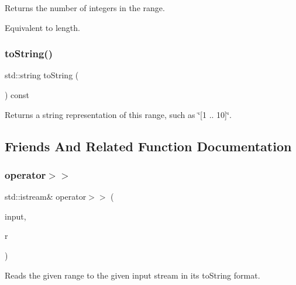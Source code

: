 Returns the number of integers in the range. 

Equivalent to length. \mbox{\label{classIntRange_a1fe5121d6528fdea3f243321b3fa3a49}} 
\subsubsection{\texorpdfstring{to\+String()}{toString()}}
{\footnotesize\ttfamily std\+::string to\+String (\begin{DoxyParamCaption}{ }\end{DoxyParamCaption}) const}



Returns a string representation of this range, such as \char`\"{}\mbox{[}1 .. 10\mbox{]}\char`\"{}. 



\subsection{Friends And Related Function Documentation}
\mbox{\label{classIntRange_a4b452901f18832cc506afd0f320e5934}} 
\subsubsection{\texorpdfstring{operator$>$$>$}{operator>>}}
{\footnotesize\ttfamily std\+::istream\& operator$>$$>$ (\begin{DoxyParamCaption}\item[{std\+::istream \&}]{input,  }\item[{\mbox{\hyperlink{classIntRange}{Int\+Range}} \&}]{r }\end{DoxyParamCaption})\hspace{0.3cm}{\ttfamily [friend]}}



Reads the given range to the given input stream in its to\+String format. 

